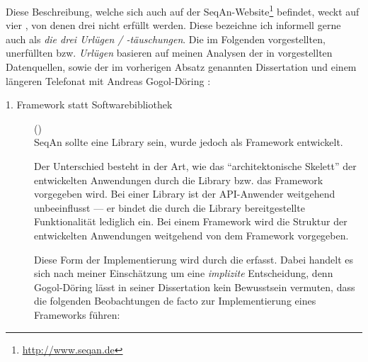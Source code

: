Diese Beschreibung, welche sich auch auf der SeqAn-Website\footnote{\url{http://www.seqan.de}} befindet, weckt auf  vier , von denen drei nicht erfüllt werden. Diese bezeichne ich informell gerne auch als \textit{die drei Urlügen / -täuschungen}. Die im Folgenden vorgestellten, unerfüllten  bzw. \textit{Urlügen} basieren auf meinen Analysen der in  vorgestellten Datenquellen, sowie der im vorherigen Absatz genannten Dissertation \citep{GogolDoring:2009vz} und einem längeren Telefonat mit Andreas Gogol-Döring \citep{GogolDoring:5iYhf2VJ}:

\begin{description}
  \item[1. Framework statt Softwarebibliothek]\label{sec:lie-library}\label{sec:library-vs-framework} () \\
  SeqAn sollte eine Library sein, wurde jedoch als Framework entwickelt.
  
  Der Unterschied besteht in der Art, wie das ``architektonische Skelett'' der entwickelten Anwendungen durch die Library bzw. das Framework vorgegeben wird. Bei einer Library ist der API-Anwender weitgehend unbeeinflusst --- er bindet die durch die Library bereitgestellte Funktionalität lediglich ein. Bei einem Framework wird die Struktur der entwickelten Anwendungen weitgehend von dem Framework vorgegeben. \citep{Fairbanks:2006jw}
  
  Diese Form der Implementierung wird durch die   erfasst. Dabei handelt es sich nach meiner Einschätzung um eine \textit{implizite} Entscheidung, denn Gogol-Döring lässt in seiner Dissertation kein Bewusstsein vermuten, dass die folgenden Beobachtungen de facto zur Implementierung eines Frameworks führen:
  

\end{description}
